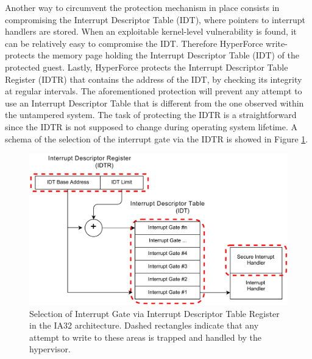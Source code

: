 Another way to circumvent the protection mechanism in place consists in compromising the Interrupt Descriptor Table (IDT), where pointers to interrupt handlers are stored. When an exploitable kernel-level vulnerability is found, it can be relatively easy to compromise the IDT. 
Therefore HyperForce write-protects the memory page holding the Interrupt Descriptor Table (IDT) of the protected guest. Lastly, HyperForce protects the Interrupt Descriptor Table Register (IDTR) that contains the address of the IDT, by checking its integrity at regular intervals. The aforementioned protection will prevent any attempt to use an Interrupt Descriptor Table that is different from the one observed within the untampered system.
The task of protecting the IDTR is a straightforward since the IDTR is not supposed to change during operating system lifetime. A schema of the selection of the interrupt gate via the IDTR is showed in Figure \ref{idtr}.



\begin{figure}
\begin{center}
\includegraphics[scale=0.5]{images/IDTR.pdf}
\caption{Selection of Interrupt Gate via Interrupt Descriptor Table Register in the IA32 architecture. Dashed rectangles indicate that any attempt to write to these areas is trapped and handled by the hypervisor.}
\label{idtr}
\end{center}
\end{figure}


